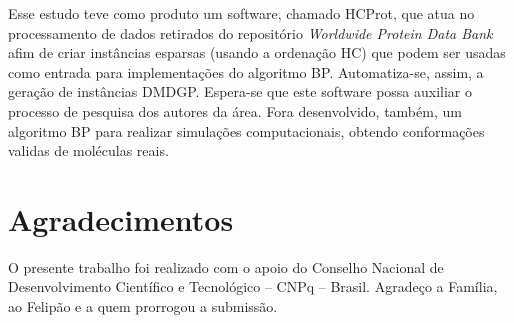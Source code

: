 \documentclass[a4,11pt]{pssbmac}
\begin{document}
	Esse estudo teve como produto um software, chamado HCProt, que atua no processamento de dados retirados do repositório \textit{Worldwide Protein Data Bank} afim de criar instâncias esparsas (usando a ordenação HC) que podem ser usadas como entrada para implementações do algoritmo BP.  Automatiza-se, assim, a geração de instâncias DMDGP. Espera-se que este software possa auxiliar o processo de pesquisa dos autores da área. Fora desenvolvido, também,  um algoritmo BP para realizar simulações computacionais, obtendo conformações validas de moléculas reais.
	
	\vspace{-0.14cm}
	\section*{Agradecimentos}
	O presente trabalho foi realizado com o apoio do Conselho Nacional de Desenvolvimento Científico e Tecnológico – CNPq – Brasil. Agradeço a Família, ao Felipão e a quem prorrogou a submissão.
	
\end{document}
